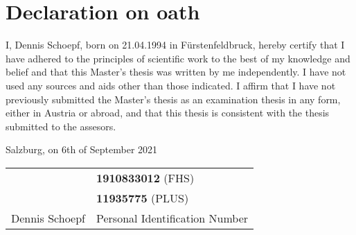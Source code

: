 \section*{Declaration on oath}

I, Dennis Schoepf, born on 21.04.1994 in Fürstenfeldbruck, hereby certify that I have adhered to the principles of scientific work to the best of my knowledge and belief and that this Master's thesis was written by me independently. I have not used any sources and aids other than those indicated.
I affirm that I have not previously submitted the Master's thesis as an examination thesis in any form, either in Austria or abroad, and that this thesis is consistent with the thesis submitted to the assesors.

\raggedright
\vspace{0.6cm}
Salzburg, on 6th of September 2021

\vspace{1.6cm}
\begin{tabularx}{\textwidth}{XX}
  ~              & \textbf{1910833012} (FHS)      \\
  ~              & \textbf{11935775} (PLUS)       \\
  Dennis Schoepf & Personal Identification Number \\
\end{tabularx}
